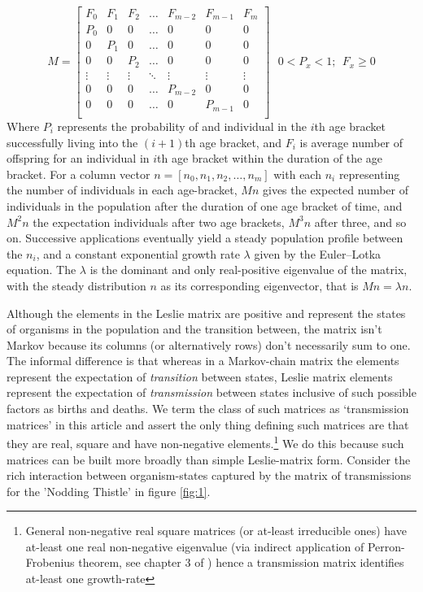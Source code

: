 \begin{equation*}
M=\begin{bmatrix}
    F_0 & F_1 & F_2 & \dots  & F_{m-2} & F_{m-1} & F_m  \\
    P_0 &  0  &  0  & \dots  &    0    &  0      &  0   \\
     0  & P_1 &  0  & \dots  &    0    &  0      &  0   \\
     0  &  0  & P_2 & \dots  &    0    &  0      &  0   \\
    \vdots & \vdots & \vdots & \ddots & \vdots & \vdots & \vdots \\
     0  &  0  &  0  & \dots  & P_{m-2} &  0      &  0   \\
     0  &  0  &  0  & \dots  &    0    & P_{m-1} &  0   \\
\end{bmatrix}
~~~0<P_x<1;~~F_x\ge0
\end{equation*}
Where $P_i$ represents the probability of and individual in the $i$th age bracket successfully living into the $(i+1)$th age bracket, and $F_i$ is average number of offspring for an individual in $i$th age bracket within the duration of the age bracket.
For a column vector $n = [n_0,n_1,n_2,\dots,n_m]$ with each $n_i$ representing the number of individuals in each age-bracket, $Mn$ gives the expected number of individuals in the population after the duration of one age bracket of time, and $M^2n$ the expectation individuals after two age brackets, $M^3n$ after three, and so on.
Successive applications eventually yield a steady population profile between the $n_i$, and a constant exponential growth rate $\lambda$ given by the Euler–Lotka equation.
The $\lambda$ is the dominant and only real-positive eigenvalue of the matrix, with the steady distribution $n$ as its corresponding eigenvector, that is $Mn=\lambda n$.

Although the elements in the Leslie matrix are positive and represent the states of organisms in the population and the transition between, the matrix isn't Markov because its columns (or alternatively rows) don't necessarily sum to one.  The informal difference is that whereas in a Markov-chain matrix the elements represent the expectation of \textit{transition} between states, Leslie matrix elements represent the expectation of \textit{transmission} between states inclusive of such possible factors as births and deaths.
We term the class of such matrices as `transmission matrices' in this article and assert the only thing defining such matrices are that they are real, square and have non-negative elements.\footnote{General non-negative real square matrices (or at-least irreducible ones) have at-least one real non-negative eigenvalue (via indirect application of Perron-Frobenius theorem, see chapter 3 of \cite{matrix2}) hence a transmission matrix identifies at-least one growth-rate}
We do this because such matrices can be built more broadly than simple Leslie-matrix form\cite{models1,models2}. Consider the rich interaction between organism-states captured by the matrix of transmissions for the 'Nodding Thistle' in figure \ref{fig:1}.



